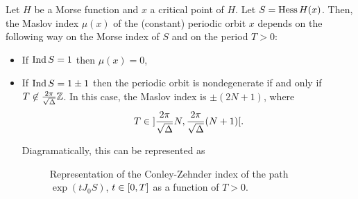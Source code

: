 \begin{prop}\label{maslovmorse}
Let $H$ be a Morse function and $x$ a critical point of $H$. Let $S = \operatorname{Hess} H(x)$. Then, the Maslov index $\mu(x)$ of the (constant) periodic orbit $x$ depends on the following way on the Morse index of $S$ and on the period $T > 0$:
\begin{itemize}
\item If $\operatorname{Ind} S = 1$ then $\mu(x) = 0$,
\item If $\operatorname{Ind} S = 1 \pm 1$ then the periodic orbit is nondegenerate if and only if $T \not \in \frac{2 \pi}{\sqrt\Delta} \mathbb{Z}$. In this case, the Maslov index is $\pm(2N+1)$, where
\begin{equation}
T \in \ointerval{\frac{2\pi}{\sqrt\Delta}N}{\frac{2\pi}{\sqrt\Delta}(N+1)}.
\end{equation}

Diagramatically, this can be represented as
\begin{figure}[H]
\centering
{}
\caption{Representation of the Conley-Zehnder index of the path $\exp(t J_0 S)$, $t \in \interval 0 T$ as a function of $T > 0$.}
\end{figure}
\end{itemize}
\end{prop}

